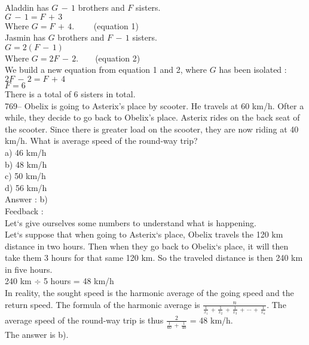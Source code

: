 \documentclass[letterpaper, 12pt]{article}
\begin{document}
Aladdin has $G\,-\,1$ brothers and $F$ sisters.\\
$G\,-\,1=F\,+\,3$\\
Where $G=F\,+\,4. \qquad$ (equation 1)\\

Jasmin has $G$ brothers and $F\,-\,1$ sisters.  \\
$G=2\left( F\,-\,1\right)  $\\
Where $G=2F\,-\,2. \qquad $(equation 2) \\

We build a new equation from equation 1 and 2, where $G$ has been isolated :\\
$2F\,-\,2=F\,+\,4$\\
$F=6$\\
There is a total of 6 sisters in total.\\



769-- Obelix is going to Asterix's place by scooter. He travels at 60 km/h.
Ofter a while, they decide to go back to Obelix's place. Asterix rides on the back seat of the scooter. Since there is greater load on the scooter, they are now riding at 40 km/h. What is average speed of the round-way trip?\\
a) 46 km/h\\
b) 48 km/h\\
c) 50 km/h\\
d) 56 km/h\\

Answer : b)\\

Feedback : \\
Let`s give ourselves some numbers to understand what is happening.\\
Let`s suppose that when going to Asterix`s place, Obelix travels the 120 km distance in two hours. Then when they go back to Obelix`s place, it will then take them 3 hours for that same 120 km. So the traveled distance is then 240 km in five hours. \\
240 km $\div$ 5 hours = 48 km/h\\

In reality, the sought speed is the harmonic average of the going speed and the return speed. The formula of the harmonic average is 
$\frac{n}{\frac{1}{x_1}\,+\,\frac{1}{x_2}\,+\,\frac{1}{x_3}\,+\,\cdots\,+\,\frac{1}{x_n}}$.
The average speed of the round-way trip is thus $\frac{2}{\frac{1}{60}\,+\,\frac{1}{40}}$ = 48 km/h.\\
The answer is b).\\
\end{document}
